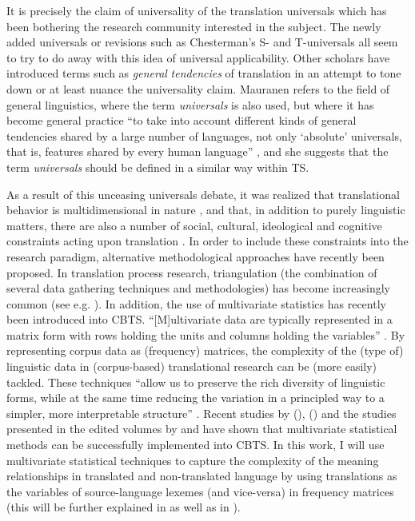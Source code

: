 It is precisely the claim of universality of the translation universals which has been bothering the research community interested in the subject. The newly added universals or revisions such as Chesterman’s S- and T-universals all seem to try to do away with this idea of universal applicability. Other scholars have introduced terms such as \textit{general} \textit{tendencies} of translation in an attempt to tone down or at least nuance the universality claim. Mauranen refers to the field of general linguistics, where the term \textit{universals} is also used, but where it has become general practice “to take into account different kinds of general tendencies shared by a large number of languages, not only ‘absolute’ universals, that is, features shared by every human language” \citep[35]{anderman_universal_2008}, and she suggests that the term \textit{universals} should be defined in a similar way within TS.

As a result of this unceasing universals debate, it was realized that translational behavior is multidimensional in nature \citep{de_sutter_inevitability_2013}, and that, in addition to purely linguistic matters, there are also a number of social, cultural, ideological and cognitive constraints acting upon translation \citep{baker_role_1999}. In order to include these constraints into the research paradigm, alternative methodological approaches have recently been proposed. In translation process research, triangulation (the combination of several data gathering techniques and methodologies) has become increasingly common (see e.g. \citealt{alves_foreword._2003,carl_triangulating_2010,shreve_integrative_2010}). In addition, the use of multivariate statistics has recently been introduced into CBTS. “[M]ultivariate data are typically represented in a matrix form with rows holding the units and columns holding the variables” \citep[302]{meng_multivariate_2012}. By representing corpus data as (frequency) matrices, the complexity of the (type of) linguistic data in (corpus-based) translational research can be (more easily) tackled. These techniques “allow us to preserve the rich diversity of linguistic forms, while at the same time reducing the variation in a principled way to a simpler, more interpretable structure” \citep[301]{meng_multivariate_2012}. Recent studies by  \citeauthor{DelaereEtAl2012} (\citeyear*{DelaereEtAl2012}), \citeauthor{szmrecsanyi_weakly_2014} (\citeyear*{szmrecsanyi_weakly_2014}) and the studies presented in the edited volumes by \citet{oakes_quantitative_2012} and \citet{DeSutterEtAl2017} have shown that multivariate statistical methods can be successfully implemented into CBTS. In this work, I will use multivariate statistical techniques to capture the complexity of the meaning relationships in translated and non-translated language by using translations as the variables of source-language lexemes (and vice-versa) in frequency matrices (this will be further explained in  as well as in ).

